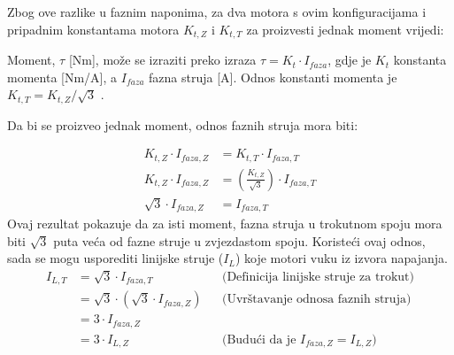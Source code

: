 \documentclass[diplomskirad]{fer}
\begin{document}
Zbog ove razlike u faznim naponima, za dva motora s ovim konfiguracijama i
pripadnim konstantama motora $K_{t, Z}$ i $K_{t, T}$ za proizvesti jednak
moment vrijedi:

Moment, $\tau$ [Nm], može se izraziti preko izraza $\tau = K_t \cdot I_{faza}$,
gdje je $K_t$ konstanta momenta [Nm/A], a $I_{faza}$ fazna struja [A]. Odnos
konstanti momenta je $K_{t, T} = K_{t, Z} / \sqrt{3}$ \cite{cite:disertacija}.

Da bi se proizveo jednak moment, odnos faznih struja mora biti:

\begin{align*}
	K_{t,Z} \cdot I_{faza,Z}  & = K_{t,T} \cdot I_{faza,T}                                 \\
	K_{t,Z} \cdot I_{faza,Z}  & = \left( \frac{K_{t,Z}}{\sqrt{3}} \right) \cdot I_{faza,T} \\
	\sqrt{3} \cdot I_{faza,Z} & = I_{faza,T}
\end{align*}
Ovaj rezultat pokazuje da za isti moment, fazna struja u trokutnom spoju mora biti $\sqrt{3}$ puta veća od fazne struje u zvjezdastom spoju.
Koristeći ovaj odnos, sada se mogu usporediti linijske struje ($I_L$) koje motori vuku iz izvora napajanja.
\begin{align*}
	I_{L,T} & = \sqrt{3} \cdot I_{faza,T}                  &  & \text{(Definicija linijske struje za trokut)}       \\
	        & = \sqrt{3} \cdot (\sqrt{3} \cdot I_{faza,Z}) &  & \text{(Uvrštavanje odnosa faznih struja)}           \\
	        & = 3 \cdot I_{faza,Z}                                                                                  \\
	        & = 3 \cdot I_{L,Z}                            &  & \text{(Budući da je } I_{faza,Z} = I_{L,Z} \text{)}
\end{align*}
\end{document}
